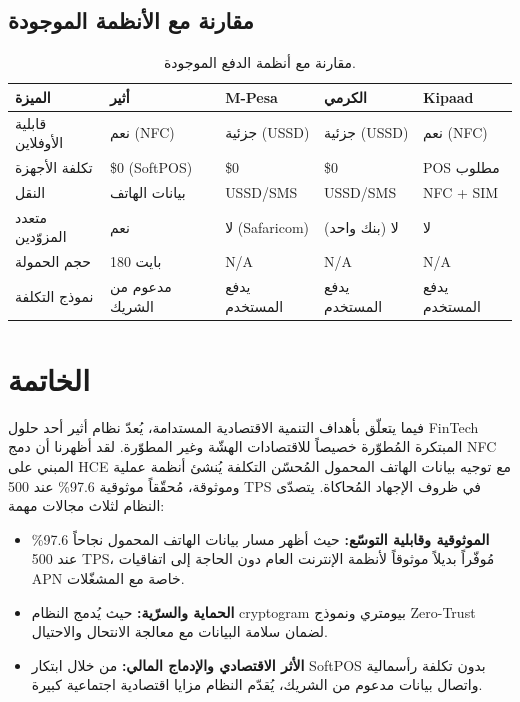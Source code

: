 \documentclass[12pt,a4paper]{article}
\begin{document}
\subsection{مقارنة مع الأنظمة الموجودة}

\begin{table}[h]
\centering
\caption{مقارنة مع أنظمة الدفع الموجودة.}
\label{tab:comparison}
\small
\begin{tabular}{@{}p{2.7cm}p{2.3cm}p{2.3cm}p{2.7cm}p{2.3cm}@{}}
\toprule
\textbf{الميزة} & \textbf{أثير} & \textbf{M-Pesa} & \textbf{الكرمي} & \textbf{Kipaad} \\
\midrule
قابلية الأوفلاين & نعم (NFC) & جزئية (USSD) & جزئية (USSD) & نعم (NFC) \\
تكلفة الأجهزة & \$0 (SoftPOS) & \$0 & \$0 & POS مطلوب \\
النقل & بيانات الهاتف & USSD/SMS & USSD/SMS & NFC + SIM \\
متعدد المزوّدين & نعم & لا (Safaricom) & لا (بنك واحد) & لا \\
حجم الحمولة & 180 بايت & N/A & N/A & N/A \\
نموذج التكلفة & مدعوم من الشريك & يدفع المستخدم & يدفع المستخدم & يدفع المستخدم \\
\bottomrule
\end{tabular}
\end{table}

\section{الخاتمة}
فيما يتعلّق بأهداف التنمية الاقتصادية المستدامة، يُعدّ نظام أثير أحد حلول FinTech المبتكرة المُطوّرة خصيصاً للاقتصادات الهشّة وغير المطوّرة. لقد أظهرنا أن دمج NFC المبني على HCE مع توجيه بيانات الهاتف المحمول المُحسّن التكلفة يُنشئ أنظمة عملية وموثوقة، مُحقّقاً موثوقية 97.6\% عند 500 TPS في ظروف الإجهاد المُحاكاة. يتصدّى النظام لثلاث مجالات مهمة:

\begin{itemize}
\item \textbf{الموثوقية وقابلية التوسّع:} حيث أظهر مسار بيانات الهاتف المحمول نجاحاً 97.6\% عند 500 TPS، مُوفّراً بديلاً موثوقاً لأنظمة الإنترنت العام دون الحاجة إلى اتفاقيات APN خاصة مع المشغّلات.
\item \textbf{الحماية والسرّية:} حيث يُدمج النظام cryptogram بيومتري ونموذج Zero-Trust لضمان سلامة البيانات مع معالجة الانتحال والاحتيال.
\item \textbf{الأثر الاقتصادي والإدماج المالي:} من خلال ابتكار SoftPOS بدون تكلفة رأسمالية واتصال بيانات مدعوم من الشريك، يُقدّم النظام مزايا اقتصادية اجتماعية كبيرة.
\end{itemize}
\end{document}
